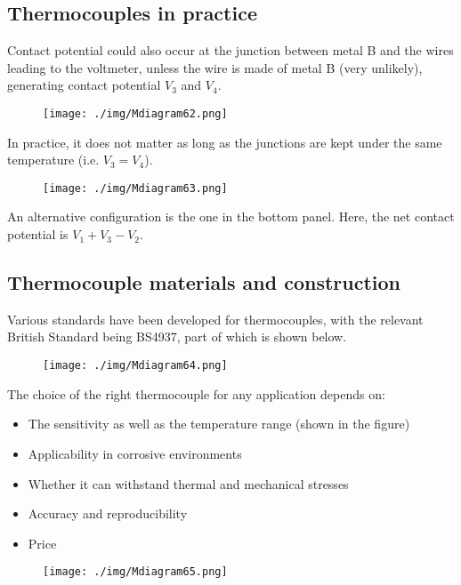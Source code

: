 \subsection{Thermocouples in practice}
Contact potential could also occur at the junction between metal B and the wires leading to the voltmeter, unless the wire is made of metal B (very unlikely), generating contact potential $V_3$ and $V_4$.
\begin{figure}[H]
  \centering
  \texttt{[image: ./img/Mdiagram62.png]}
\end{figure}
In practice, it does not matter as long as the junctions are kept under the same temperature (i.e. $V_3 = V_4$).
\begin{figure}[H]
  \centering
  \texttt{[image: ./img/Mdiagram63.png]}
\end{figure}
An alternative configuration is the one in the bottom panel. Here, the net contact potential is $V_1+V_3-V_2$.
\subsection{Thermocouple materials and construction}
Various standards have been developed for thermocouples, with the relevant British Standard being BS4937, part of which is shown below.
\begin{figure}[H]
  \centering
  \texttt{[image: ./img/Mdiagram64.png]}
\end{figure}
The choice of the right thermocouple for any application depends on:
\begin{itemize}
  \item The sensitivity as well as the temperature range (shown in the figure)
  \item Applicability in corrosive environments
  \item Whether it can withstand thermal and mechanical stresses
  \item Accuracy and reproducibility
  \item Price
\end{itemize}
\begin{figure}[H]
  \centering
  \texttt{[image: ./img/Mdiagram65.png]}
\end{figure}
